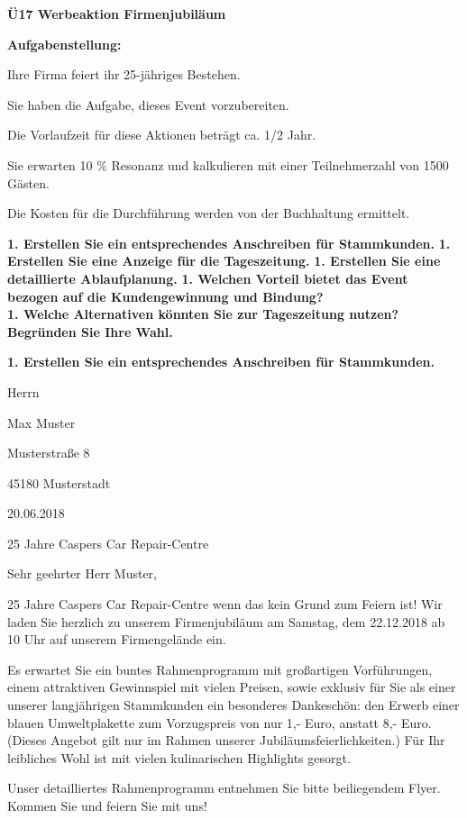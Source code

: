 \textbf{Ü17 Werbeaktion Firmenjubiläum}

\textbf{Aufgabenstellung:}

Ihre Firma feiert ihr 25-jähriges Bestehen.

Sie haben die Aufgabe, dieses Event vorzubereiten.

Die Vorlaufzeit für diese Aktionen beträgt ca. 1/2 Jahr.

Sie erwarten 10 \% Resonanz und kalkulieren mit einer Teilnehmerzahl von
1500 Gästen.

Die Kosten für die Durchführung werden von der Buchhaltung ermittelt.

\textbf{1. Erstellen Sie ein entsprechendes Anschreiben für
Stammkunden.} \textbf{1. Erstellen Sie eine Anzeige für die
Tageszeitung.} \textbf{1. Erstellen Sie eine detaillierte
Ablaufplanung.} \textbf{1. Welchen Vorteil bietet das Event bezogen auf
die Kundengewinnung und Bindung?}\\
\textbf{1. Welche Alternativen könnten Sie zur Tageszeitung nutzen?
Begründen Sie Ihre Wahl.}

\newpage

\textbf{1. Erstellen Sie ein entsprechendes Anschreiben für
Stammkunden.}

Herrn

Max Muster

Musterstraße 8

45180 Musterstadt

20.06.2018

25 Jahre Caspers Car Repair-Centre

Sehr geehrter Herr Muster,

25 Jahre Caspers Car Repair-Centre wenn das kein Grund zum Feiern ist!
Wir laden Sie herzlich zu unserem Firmenjubiläum am Samstag, dem
22.12.2018 ab 10 Uhr auf unserem Firmengelände ein.

Es erwartet Sie ein buntes Rahmenprogramm mit großartigen Vorführungen,
einem attraktiven Gewinnspiel mit vielen Preisen, sowie exklusiv für Sie
als einer unserer langjährigen Stammkunden ein besonderes Dankeschön:
den Erwerb einer blauen Umweltplakette zum Vorzugspreis von nur 1,-
Euro, anstatt 8,- Euro. (Dieses Angebot gilt nur im Rahmen unserer
Jubiläumsfeierlichkeiten.) Für Ihr leibliches Wohl ist mit vielen
kulinarischen Highlights gesorgt.

Unser detailliertes Rahmenprogramm entnehmen Sie bitte beiliegendem
Flyer. Kommen Sie und feiern Sie mit uns!

